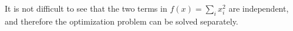 It is not difficult to see that the two terms in $f(x) = \sum_{i} x_i^2$ are independent, and therefore the optimization problem can be solved separately.
